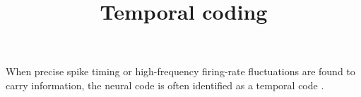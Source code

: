 \documentclass[a4paper]{article}
\title{Temporal coding}
\date{}
\begin{document}
    \maketitle
    When precise spike timing or high-frequency firing-rate fluctuations are found to carry information, the neural code is often identified as a temporal code  .
    
    
    
\end{document}
